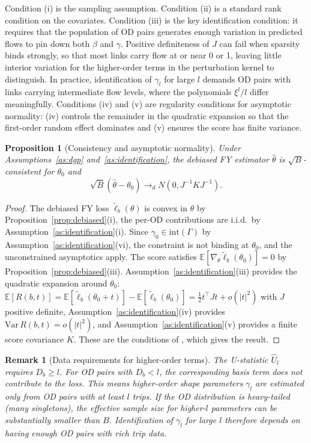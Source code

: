 \documentclass[12pt]{article}
\newtheorem{proposition}{Proposition}
\newtheorem{remark}{Remark}
\begin{document}
Condition (i) is the sampling assumption. Condition (ii) is a standard rank condition on the covariates. Condition (iii) is the key identification condition: it requires that the population of OD pairs generates enough variation in predicted flows to pin down both $\beta$ and $\gamma$. Positive definiteness of $J$ can fail when sparsity binds strongly, so that most links carry flow at or near 0 or 1, leaving little interior variation for the higher-order terms in the perturbation kernel to distinguish. In practice, identification of $\gamma_l$ for large $l$ demands OD pairs with links carrying intermediate flow levels, where the polynomials $\xi^l/l$ differ meaningfully. Conditions (iv) and (v) are regularity conditions for asymptotic normality: (iv) controls the remainder in the quadratic expansion so that the first-order random effect dominates and (v) ensures the score has finite variance.

\begin{proposition}[Consistency and asymptotic normality]\label{prop:asymptotic}
Under Assumptions~\ref{as:dgp} and~\ref{as:identification}, the debiased FY estimator $\hat{\theta}$ is $\sqrt{B}$-consistent for $\theta_0$ and
\[
    \sqrt{B}(\hat{\theta} - \theta_0) \to_d N(0, J^{-1} K J^{-1}).
\]
\end{proposition}

\begin{proof}
The debiased FY loss $\tilde{\ell}_b(\theta)$ is convex in $\theta$ by Proposition~\ref{prop:debiased}(i),  the per-OD contributions are i.i.d.\ by Assumption~\ref{as:identification}(i). Since $\gamma_0 \in \mathrm{int}(\Gamma)$ by Assumption~\ref{as:identification}(vi), the constraint is not binding at $\theta_0$, and the unconstrained asymptotics apply. The score satisfies $\mathbb{E}[\nabla_\theta \tilde{\ell}_b(\theta_0)] = 0$ by Proposition~\ref{prop:debiased}(iii). Assumption~\ref{as:identification}(iii) provides the quadratic expansion around $\theta_0$: $\mathbb{E}[R(b, t)] = \mathbb{E}[\tilde{\ell}_b(\theta_0 + t)] - \mathbb{E}[\tilde{\ell}_b(\theta_0)] = \frac{1}{2} t^\top J t + o(|t|^2)$ with $J$ positive definite, Assumption~\ref{as:identification}(iv) provides $\mathrm{Var}\, R(b, t) = o(|t|^2)$, and Assumption~\ref{as:identification}(v) provides a finite score covariance $K$. These are the conditions of \citet[Theorem~2.1]{hjort_asymptotics_2011}, which gives the result.
\end{proof}


\begin{remark}[Data requirements for higher-order terms]
The U-statistic $\hat{U}_l$ requires $D_b \geq l$. For OD pairs
with $D_b < l$, the corresponding basis term does not contribute
to the loss. This means higher-order shape parameters $\gamma_l$
are estimated only from OD pairs with at least $l$ trips. If the
OD distribution is heavy-tailed (many singletons), the effective
sample size for higher-$l$ parameters can be substantially smaller
than $B$. Identification of $\gamma_l$ for large $l$ therefore
depends on having enough OD pairs with rich trip data.
\end{remark}
\end{document}
